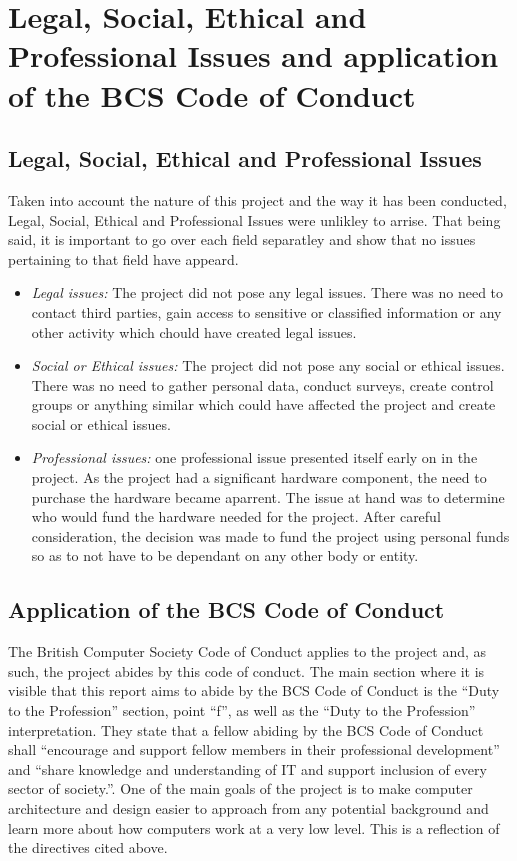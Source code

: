 \chapter{Legal, Social, Ethical and Professional Issues and application of the BCS Code of Conduct}

\section{Legal, Social, Ethical and Professional Issues}

Taken into account the nature of this project and the way it has been conducted,
Legal, Social, Ethical and Professional Issues were unlikley to arrise. That being
said, it is important to go over each field separatley and show that no issues pertaining
to that field have appeard.

\begin{itemize}
  \item \emph{Legal issues: } The project did not pose any legal issues. There was no need
  to contact third parties, gain access to sensitive or classified information or any other
  activity which chould have created legal issues.
  \item \emph{Social or Ethical issues: } The project did not pose any social or ethical issues.
  There was no need to gather personal data, conduct surveys, create control groups or anything
  similar which could have affected the project and create social or ethical issues.
  \item \emph{Professional issues: } one professional issue presented itself early on in the
  project. As the project had a significant hardware component, the need to purchase the hardware
  became aparrent. The issue at hand was to determine who would fund the hardware needed for the
  project. After careful consideration, the decision was made to fund the project using personal funds
  so as to not have to be dependant on any other body or entity.
\end{itemize}


\section{Application of the BCS Code of Conduct}
The British Computer Society Code of Conduct \cite{bcs} applies to the project and, as such, the
project abides by this code of conduct. The main section where it is visible that this report aims to
abide by the BCS Code of Conduct is the ``Duty to the Profession'' section, point ``f'', as  well as
the ``Duty to the Profession'' interpretation. They state that a fellow abiding by the BCS Code
of Conduct shall ``encourage and support fellow members in their professional development'' and ``share
knowledge and understanding of IT and support inclusion of every sector of society.''. One of the main
goals of the project is to make computer architecture and design easier to approach from any
potential background and learn more about how computers work at a very low level. This is a reflection
of the directives cited above.
